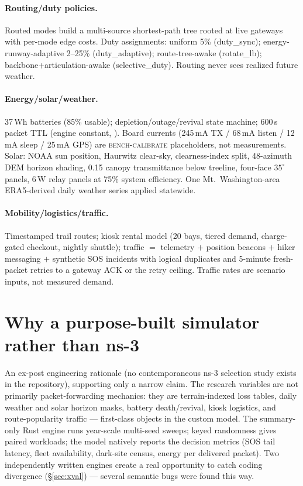 \documentclass[11pt]{article}
\begin{document}
\paragraph{Routing/duty policies.} Routed modes build a multi-source
shortest-path tree rooted at live gateways with per-mode edge costs. Duty
assignments: uniform 5\% (duty\_sync); energy-runway-adaptive 2--25\%
(duty\_adaptive); route-tree-awake (rotate\_lb); backbone{+}articulation-awake
(selective\_duty). Routing never sees realized future weather.

\paragraph{Energy/solar/weather.} 37\,Wh batteries (85\% usable);
depletion/outage/revival state machine; 600\,s packet TTL (engine constant,
). Board currents (245\,mA TX / 68\,mA listen /
12\,mA sleep / 25\,mA GPS) are \textsc{bench-calibrate} placeholders, not
measurements. Solar: NOAA sun position, Haurwitz clear-sky, clearness-index
split, 48-azimuth DEM horizon shading, 0.15 canopy transmittance below
treeline, four-face $35^{\circ}$ panels, 6\,W relay panels at 75\% system
efficiency. One Mt.~Washington-area ERA5-derived daily weather series applied
statewide.

\paragraph{Mobility/logistics/traffic.} Timestamped trail routes; kiosk
rental model (20 bays, tiered demand, charge-gated checkout, nightly
shuttle); traffic $=$ telemetry $+$ position beacons $+$ hiker messaging $+$
synthetic SOS incidents with logical duplicates and 5-minute fresh-packet
retries to a gateway ACK or the retry ceiling. Traffic rates are scenario
inputs, not measured demand.

\section{Why a purpose-built simulator rather than ns-3}\label{sec:ns3}

An ex-post engineering rationale (no contemporaneous ns-3 selection study
exists in the repository), supporting only a narrow claim. The research
variables are not primarily packet-forwarding mechanics: they are
terrain-indexed loss tables, daily weather and solar horizon masks, battery
death/revival, kiosk logistics, and route-popularity traffic --- first-class
objects in the custom model. The summary-only Rust engine runs year-scale
multi-seed sweeps; keyed randomness gives paired workloads; the model
natively reports the decision metrics (SOS tail latency, fleet availability,
dark-site census, energy per delivered packet). Two independently written
engines create a real opportunity to catch coding divergence
(\S\ref{sec:xval}) --- several semantic bugs were found this way.
\end{document}
